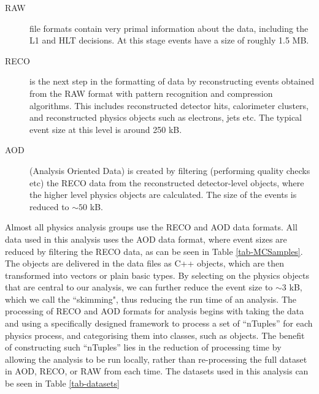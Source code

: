 \begin{description}
	\item[RAW] file formats contain very primal information about the data, including the L1 and HLT decisions. At this stage events have a size of roughly 1.5 MB. 
	\item[RECO] is the next step in the formatting of data by reconstructing events obtained from the RAW format with pattern recognition and compression algorithms. This includes reconstructed detector hits, calorimeter clusters, and reconstructed physics objects such as electrons, jets etc. The typical event size at this level is around 250 kB.
	\item[AOD] (Analysis Oriented Data) is created by filtering (performing quality checks etc) the RECO data from the reconstructed detector-level objects, where the higher level physics objects are calculated. The size of the events is reduced to $\sim50$ kB.	
\end{description}

Almost all physics analysis groups use the RECO and AOD data formats. All data used in this analysis uses the AOD data format, where event sizes are reduced by filtering the RECO data, as can be seen in Table \ref{tab-MCSamples}. The objects are delivered in the data files as C++ objects, which are then transformed into vectors or plain basic types. By selecting on the physics objects that are central to our analysis, we can further reduce the event size to $\sim$3 kB, which we call the ``skimming", thus reducing the run time of an analysis. The processing of RECO and AOD formats for analysis begins with taking the data and using a specifically designed framework to process a set of ``nTuples'' for each physics process, and categorising them into classes, such as objects. The benefit of constructing such ``nTuples'' lies in the reduction of processing time by allowing the analysis to be run locally, rather than re-processing the full dataset in AOD, RECO, or RAW from each time. The datasets used in this analysis can be seen in Table \ref{tab-datasets}


